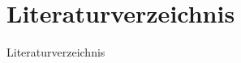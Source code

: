 \section{Literaturverzeichnis}
\begin{frame}[allowframebreaks]{Literaturverzeichnis}
    \nocite{*} %
    \printbibliography[heading=none]
\end{frame}
